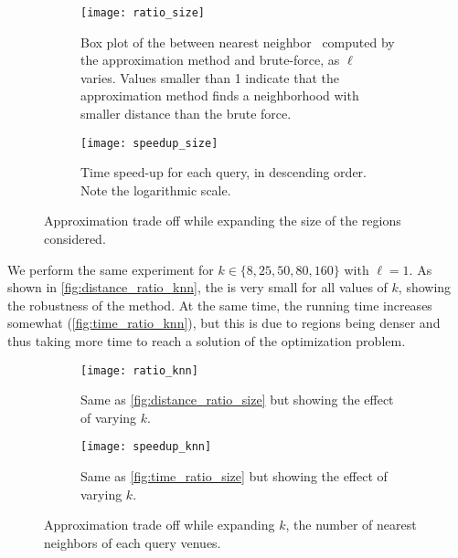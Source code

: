 \begin{figure}[t]
    \begin{subfigure}[b]{\linewidth}
        \centering
        \texttt{[image: ratio\_size]}
		\caption[\Dratio{} as $\ell$ increases]{Box plot of the \Dratio{} between
          nearest neighbor \emd\ computed by the approximation
          method and brute-force, as $\ell$ varies.
          Values smaller than 1 indicate that the approximation method
          finds a neighborhood with smaller distance than the brute force. 
	\label{fig:distance_ratio_size}}
    \end{subfigure}

    \begin{subfigure}[b]{\linewidth}
        \centering
        \texttt{[image: speedup\_size]}
	\caption[Time speed-up as $\ell$ increases]{Time speed-up for each query, in
          descending order. Note the logarithmic scale.\label{fig:time_ratio_size}}
    \end{subfigure}
    \caption[Approximation trade off with respect to $\ell$]{Approximation
    trade off while expanding the size of the regions
    considered.\label{fig:approx_by_size}}
\end{figure}

We perform the same experiment for $k \in \{8, 25, 50, 80, 160\}$ with
$\ell=1$.  As shown in \autoref{fig:distance_ratio_knn}, the \Dratio{} is very
small for all values of $k$, showing the robustness of the method.  At the same
time, the running time increases somewhat (\autoref{fig:time_ratio_knn}), but
this is due to regions being denser and thus \emd{} taking more time to reach a
solution of the optimization problem.

\begin{figure}[t]
        \centering
    \begin{subfigure}[b]{\linewidth}
        \texttt{[image: ratio\_knn]}
		\caption[\Dratio{} as $k$ increases]{Same as
			\autoref{fig:distance_ratio_size} but showing the effect of varying
			$k$.  \label{fig:distance_ratio_knn}}
    \end{subfigure}

    \begin{subfigure}[b]{\linewidth}
        \centering
        \texttt{[image: speedup\_knn]}
	\caption[Time speed-up as $k$ increases]{Same as
			\autoref{fig:time_ratio_size} but showing the effect of varying
			$k$.\label{fig:time_ratio_knn}}
    \end{subfigure}
    \caption[Approximation trade off with respect to $k$]{Approximation trade
	    off while expanding $k$, the number of nearest neighbors of each
    query venues.\label{fig:approx_by_knn}}
\end{figure}


